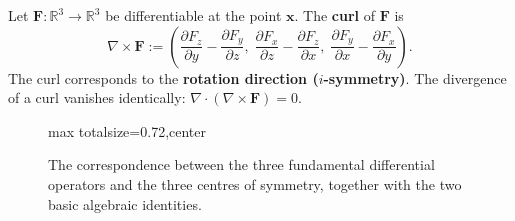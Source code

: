 \begin{definition}[Curl]\label{def:curl}
Let $\mathbf{F}: \mathbb{R}^3 \to \mathbb{R}^3$ be differentiable at the point $\mathbf{x}$. The \textbf{curl} of $\mathbf{F}$ is
\[
\nabla \times \mathbf{F} := \left( \frac{\partial F_z}{\partial y} - \frac{\partial F_y}{\partial z},\; \frac{\partial F_x}{\partial z} - \frac{\partial F_z}{\partial x},\; \frac{\partial F_y}{\partial x} - \frac{\partial F_x}{\partial y} \right).
\]
The curl corresponds to the \textbf{rotation direction ($i$-symmetry)}. The divergence of a curl vanishes identically: $\nabla \cdot (\nabla \times \mathbf{F}) = 0$.
\end{definition}

\begin{figure}[htbp]
\centering
\begin{adjustbox}{max totalsize={\linewidth}{0.72\textheight},center}
\end{adjustbox}
\caption{The correspondence between the three fundamental differential operators and the three centres of symmetry, together with the two basic algebraic identities.}
\label{fig:three_operators}
\end{figure}

